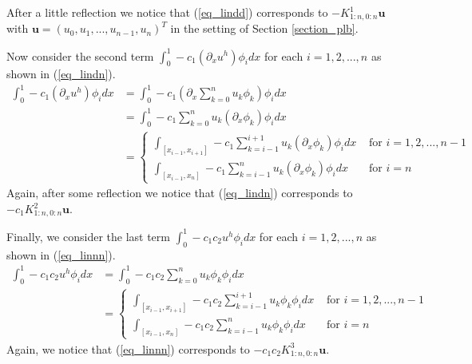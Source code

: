 \documentclass[11pt,fleqn]{article}
\theoremstyle{defstyle}
\begin{document}
After a little reflection we notice that (\ref{eq_lindd}) corresponds to $-K^1_{1:n, 0:n}\mathbf{u}$ with $\mathbf{u} = \left(u_0, u_1,...,u_{n-1}, u_n \right)^T$ in the setting of Section \ref{section_plb}.

Now consider the second term $\int_0^1  -c_1(\partial_xu^h)\phi_idx$  for each $i=1,2,...,n$ as shown in (\ref{eq_lindn}).
\begin{equation}
\begin{aligned}
\int_0^1 -c_1(\partial_xu^h)\phi_idx &= \int_0^1 - c_1(\partial_x \sum_{k=0}^{n} u_k\phi_k)\phi_i dx \\
&= \int_0^1 -c_1\sum_{k=0}^{n} u_k(\partial_x\phi_k)\phi_idx \\
&= \begin{cases}
\int_{[x_{i-1},x_{i+1}]}-c_1\sum_{k=i-1}^{i+1} u_k(\partial_x\phi_k)\phi_idx &\text{ for } i=1,2,..., n-1 \\
\int_{[x_{i-1},x_{n}]}-c_1\sum_{k=i-1}^{n} u_k(\partial_x\phi_k)\phi_idx &\text{ for } i=n
\end{cases}
\end{aligned}
\label{eq_lindn}
\end{equation}
Again, after some reflection we notice that (\ref{eq_lindn}) corresponds to $-c_1K^2_{1:n, 0:n}\mathbf{u}$. 

Finally, we consider the last term $\int_0^1 - c_1c_2u^h\phi_idx$ for each $i=1,2,...,n$ as shown in (\ref{eq_linnn}).
\begin{equation}
\begin{aligned}
\int_0^1 -c_1c_2u^h\phi_idx &= \int_0^1 - c_1c_2\sum_{k=0}^{n} u_k\phi_k\phi_i dx \\
&= \begin{cases}
\int_{[x_{i-1},x_{i+1}]}-c_1c_2\sum_{k=i-1}^{i+1} u_k\phi_k\phi_idx &\text{ for } i=1,2,..., n-1 \\
\int_{[x_{i-1},x_{n}]}-c_1c_2\sum_{k=i-1}^{n} u_k\phi_k\phi_idx &\text{ for } i=n
\end{cases}
\end{aligned}
\label{eq_linnn}
\end{equation}
Again, we notice that (\ref{eq_linnn}) corresponds to $-c_1c_2K^3_{1:n, 0:n}\mathbf{u}$.
\end{document}

